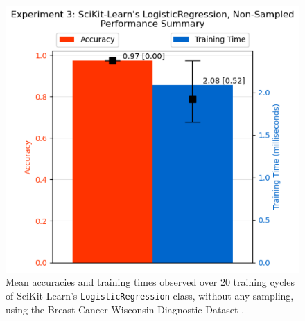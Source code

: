 \documentclass{article}
\theoremstyle{plain}
\theoremstyle{definition}
\theoremstyle{remark}
\begin{document}
\begin{figure}[ht]
\vskip 0.2in
\begin{center}
\centerline{\includegraphics[width=\columnwidth]{experiment_3b}}
\caption{Mean accuracies and training times observed over 20 training cycles of SciKit-Learn's \texttt{LogisticRegression} class, without any sampling, using the Breast Cancer Wisconsin Diagnostic Dataset \cite{breastcancer}.}
\label{experiment_1a}
\end{center}
\vskip -0.2in
\end{figure}
\end{document}
